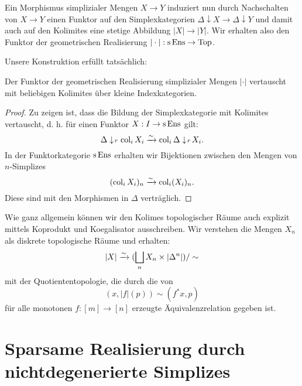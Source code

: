 Ein Morphismus simplizialer Mengen $X \to Y$ induziert nun durch
Nachschalten von $X \to Y$ einen Funktor auf den Simplexkategorien
$\Delta \downarrow X \to \Delta \downarrow Y$ und damit auch auf den
Kolimites eine stetige Abbildung $|X| \to |Y|$. Wir erhalten also den
Funktor der geometrischen Realisierung $| \cdot |: \operatorname{s} \operatorname{Ens} \to \operatorname{Top}$.

Unsere Konstruktion erfüllt tatsächlich:
\begin{prop}
  Der Funktor der geometrischen Realisierung simplizialer Mengen $|
  \cdot|$ vertauscht mit beliebigen Kolimites über kleine
  Indexkategorien.
\end{prop}
\begin{proof}
  Zu zeigen ist, dass die Bildung der Simplexkategorie mit Kolimites
  vertauscht, d. h. für einen Funktor $X: I \to \operatorname{s}\operatorname{Ens}$ gilt:
  \[ \Delta \downarrow \! {\scriptstyle r} \, \operatorname{col}_i X_i \xrightarrow[]{\sim} \operatorname{col}_i \Delta \downarrow \! {\scriptstyle r} \, X_i. \]
  In der Funktorkategorie $\operatorname{s}\operatorname{Ens}$ erhalten wir Bijektionen zwischen
  den Mengen von $n$-Simplizes
  \[ (\operatorname{col}_i X_i)_n \xrightarrow[]{\sim} \operatorname{col}_i (X_i)_n. \]
  Diese sind mit den Morphismen in $\Delta$ verträglich.
\end{proof}

Wie ganz allgemein können wir den Kolimes topologischer Räume auch
explizit mittels Koprodukt und Koegalisator ausschreiben. Wir
verstehen die Mengen $X_n$ als diskrete topologische Räume und
erhalten:
\[ |X| \xrightarrow[]{\sim} (\bigsqcup_n X_n \times |\Delta^n|) / \sim \]
mit der Quotiententopologie, die durch die von
\[ (x, |f|(p)) \sim (f^* x, p) \]
für alle monotonen $f: [m] \to [n]$ erzeugte Äquivalenzrelation
gegeben ist.

\section{Sparsame Realisierung durch nichtdegenerierte Simplizes}

